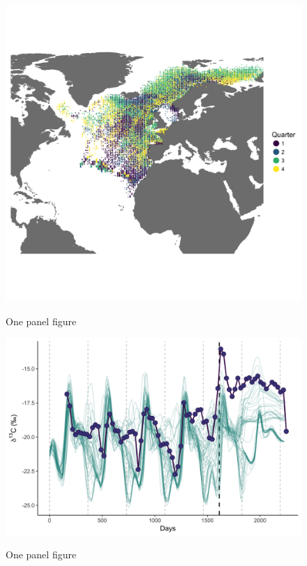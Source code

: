 \documentclass[a4paper,12pt]{article}
\begin{document}
\begin{figure}
  \centering
  \includegraphics[width = \linewidth]{figures/Figure-1b-migratory-model-full-map.png}
  \label{fig2}
  \caption{One panel figure}
\end{figure}

\begin{figure}
  \centering
  \includegraphics[width = \linewidth]{figures/Figure-1c-migratory-model-d13C.png}
  \label{fig3}
  \caption{One panel figure}
\end{figure}
\end{document}
